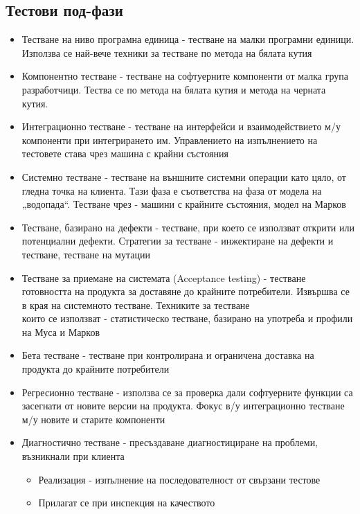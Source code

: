 \documentclass[fleqn,12pt]{article}
\begin{document}
\begin{flushleft}
\subsection{Тестови под-фази}
    \begin{itemize}
        \item Тестване на ниво програмна единица - тестване на малки програмни единици. Използва се най-вече техники за тестване по метода на бялата кутия
        \item Компонентно тестване - тестване на софтуерните компоненти от малка група разработчици. Тества се по метода на бялата кутия и метода на черната кутия.
        \item Интеграционно тестване - тестване на интерфейси и взаимодействието м/у компоненти при интегрирането им. Управлението на изпълнението на тестовете става чрез машина с крайни състояния
        \item Системно тестване - тестване на външните системни операции като цяло, от гледна точка на клиента. Тази фаза е съответства на фаза от модела на „водопада``. Тестване чрез - машини с крайните състояния, модел на Марков
        \item Тестване, базирано на дефекти - тестване, при което се използват открити или потенциални дефекти. Стратегии за тестване - инжектиране на дефекти и тестване, тестване на мутации
        \item Тестване за приемане на системата (Acceptance testing) - тестване готовността на продукта за доставяне до крайните потребители. Извършва се в края на системното тестване. Техниките за тестване\\
        които се използват - статистическо тестване, базирано на употреба и профили на Муса и Марков
        \item Бета тестване - тестване при контролирана и ограничена доставка на продукта до крайните потребители
        \item Регресионно тестване - използва се за проверка дали софтуерните функции са засегнати от новите версии на продукта. Фокус в/у интеграционно тестване м/у новите и старите компоненти
        \item Диагностично тестване - пресъздаване диагностициране на проблеми, възникнали при клиента
            \begin{itemize}
                \item Реализация - изпълнение на последователност от свързани тестове
                \item Прилагат се при инспекция на качеството
            \end{itemize}
        \end{itemize}


\end{flushleft}
\end{document}
